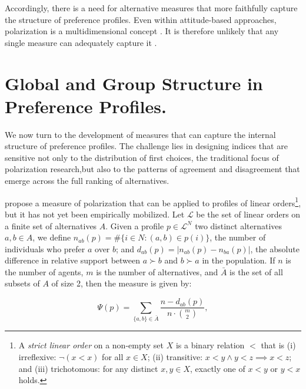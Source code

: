 \documentclass[12pt]{article}
\begin{document}
Accordingly, there is a need for alternative measures that more faithfully capture the structure of preference profiles. Even within attitude-based approaches, polarization is a multidimensional concept \parencite{bramson2017understanding, bramson16_disam_social_polar_concep_measur}. It is therefore unlikely that any single measure can adequately capture it \parencite{patty2019measuring, patty14_analy_big_data}.


\section{Global and Group Structure in Preference Profiles.}

We now turn to the development of measures that can capture the internal structure of preference profiles. The challenge lies in designing indices that are sensitive not only to the distribution of first choices, the traditional focus of polarization research,but also to the patterns of agreement and disagreement that emerge across the full ranking of alternatives.

\textcite{can2015measuring} propose a measure of polarization that can be applied to profiles of linear orders\footnote{A \emph{strict linear order} on a non-empty set \(X\) is a binary relation \(<\) that is (i) {irreflexive}: \(\lnot(x<x)\) for all \(x\in X\); (ii) {transitive}: \(x<y\land y<z\!\implies\! x<z\); and (iii) {trichotomous}: for any distinct \(x,y\in X\), exactly one of \(x<y\) or \(y<x\) holds.  }, but it has not yet been empirically mobilized. Let \( \mathcal{L} \) be the set of linear orders on a finite set of alternatives \( A \). Given a profile \( p \in \mathcal{L}^N \) two distinct alternatives \( a, b \in A \), we define \( n_{ab}(p) = \# \{ i \in N : (a, b) \in p(i) \} \), the number of individuals who prefer \( a \) over \( b \); and  \( d_{ab}(p) = |n_{ab}(p) - n_{ba}(p)| \), the absolute difference in relative support between \( a \succ b \) and \( b \succ a \) in the population. If \( n \) is the number of agents,  \( m \) is the number of alternatives, and \(\bar{A}\) is the set of all subsets of \(A\) of size 2,  then the measure is given by:

\[
\Psi(p) = \sum_{\{a,b\} \in \bar{A}} \frac{n - d_{ab}(p)}{n \cdot \binom{m}{2}},
\]
\end{document}
